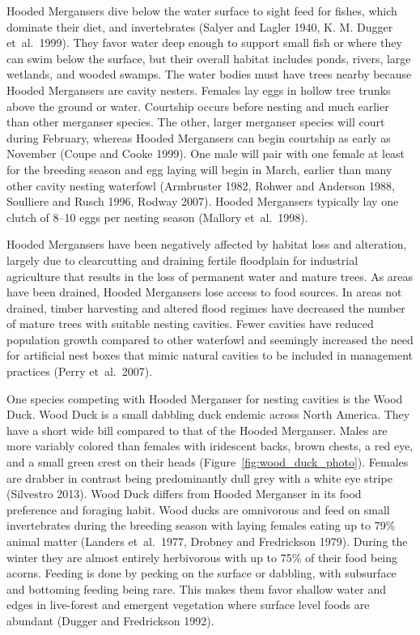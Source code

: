  


Hooded Mergansers dive below the water surface to sight feed for fishes, which dominate their diet, and invertebrates (Salyer and Lagler 1940, K. M. Dugger et~al.~1999). They favor water deep enough to support small fish or where they can swim below the surface, but their overall habitat includes ponds, rivers, large wetlands, and wooded swamps. The water bodies must have trees nearby because Hooded Mergansers are cavity nesters. Females lay eggs in hollow tree trunks above the ground or water. Courtship occurs before nesting and much earlier than other merganser species. The other, larger merganser species will court during February, whereas Hooded Mergansers can begin courtship as early as November (Coupe and Cooke 1999). One male will pair with one female at least for the breeding season and egg laying will begin in March, earlier than many other cavity nesting waterfowl (Armbruster 1982, Rohwer and Anderson 1988, Soulliere and Rusch 1996, Rodway 2007). Hooded Mergansers typically lay one clutch of 8–10 eggs per nesting season (Mallory et~al.~1998).  

Hooded Mergansers have been negatively affected by habitat loss and alteration, largely due to clearcutting and draining fertile floodplain for industrial agriculture that results in the loss of permanent water and mature trees. As areas have been drained, Hooded Mergansers lose access to food sources. In areas not drained, timber harvesting and altered flood regimes have decreased the number of mature trees with suitable nesting cavities. Fewer cavities have reduced population growth compared to other waterfowl and seemingly increased the need for artificial nest boxes that mimic natural cavities to be included in management practices (Perry et~al.~2007).

One species competing with Hooded Merganser for nesting cavities is the Wood Duck.  Wood Duck is a small dabbling duck endemic across North America. They have a short wide bill compared to that of the Hooded Merganser. Males are more variably colored than females with iridescent backs, brown chests, a red eye, and a small green crest on their heads (Figure~\ref{fig:wood_duck_photo}). Females are drabber in contrast being predominantly dull grey with a white eye stripe (Silvestro 2013). Wood Duck differs from Hooded Merganser in its food preference and foraging habit. Wood ducks are omnivorous and feed on small invertebrates during the breeding season with laying females eating up to 79\% animal matter (Landers et~al.~1977, Drobney and Fredrickson 1979). During the winter they are almost entirely herbivorous with up to 75\% of their food being acorns. Feeding is done by pecking on the surface or dabbling, with subsurface and bottoming feeding being rare. This makes them favor shallow water and edges in live-forest and emergent vegetation where surface level foods are abundant (Dugger and Fredrickson 1992).  

